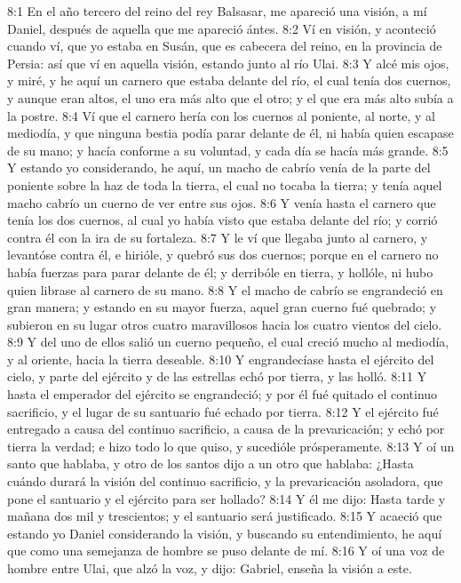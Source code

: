 8:1 En el año tercero del reino del rey Balsasar, me apareció una visión, a mí Daniel, después de aquella que me apareció ántes.
8:2 Ví en visión, y aconteció cuando ví, que yo estaba en Susán, que es cabecera del reino, en la provincia de Persia: así que ví en aquella visión, estando junto al río Ulai.
8:3 Y alcé mis ojos, y miré, y he aquí un carnero que estaba delante del río, el cual tenía dos cuernos, y aunque eran altos, el uno era más alto que el otro; y el que era más alto subía a la postre.
8:4 Ví que el carnero hería con los cuernos al poniente, al norte, y al mediodía, y que ninguna bestia podía parar delante de él, ni había quien escapase de su mano; y hacía conforme a su voluntad, y cada día se hacía más grande.
8:5 Y estando yo considerando, he aquí, un macho de cabrío venía de la parte del poniente sobre la haz de toda la tierra, el cual no tocaba la tierra; y tenía aquel macho cabrío un cuerno de ver entre sus ojos.
8:6 Y venía hasta el carnero que tenía los dos cuernos, al cual yo había visto que estaba delante del río; y corrió contra él con la ira de su fortaleza.
8:7 Y le ví que llegaba junto al carnero, y levantóse contra él, e hirióle, y quebró sus dos cuernos; porque en el carnero no había fuerzas para parar delante de él; y derribóle en tierra, y hollóle, ni hubo quien librase al carnero de su mano.
8:8 Y el macho de cabrío se engrandeció en gran manera; y estando en su mayor fuerza, aquel gran cuerno fué quebrado; y subieron en su lugar otros cuatro maravillosos hacia los cuatro vientos del cielo.
8:9 Y del uno de ellos salió un cuerno pequeño, el cual creció mucho al mediodía, y al oriente, hacia la tierra deseable.
8:10 Y engrandecíase hasta el ejército del cielo, y parte del ejército y de las estrellas echó por tierra, y las holló.
8:11 Y hasta el emperador del ejército se engrandeció; y por él fué quitado el continuo sacrificio, y el lugar de su santuario fué echado por tierra.
8:12 Y el ejército fué entregado a causa del continuo sacrificio, a causa de la prevaricación; y echó por tierra la verdad; e hizo todo lo que quiso, y sucedióle prósperamente.
8:13 Y oí un santo que hablaba, y otro de los santos dijo a un otro que hablaba: ¿Hasta cuándo durará la visión del continuo sacrificio, y la prevaricación asoladora, que pone el santuario y el ejército para ser hollado?
8:14 Y él me dijo: Hasta tarde y mañana dos mil y trescientos; y el santuario será justificado.
8:15 Y acaeció que estando yo Daniel considerando la visión, y buscando su entendimiento, he aquí que como una semejanza de hombre se puso delante de mí.
8:16 Y oí una voz de hombre entre Ulai, que alzó la voz, y dijo: Gabriel, enseña la visión a este.

